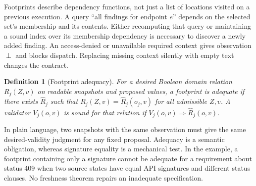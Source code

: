 \documentclass[pdflatex,sn-mathphys-num]{sn-jnl}
\theoremstyle{thmstyleone}
\theoremstyle{thmstylethree}
\newtheorem{definition}{Definition}
\theoremstyle{thmstyletwo}
\newcommand{\botv}{\perp}
\begin{document}
Footprints describe dependency functions, not just a list of locations visited on a previous execution. A query ``all findings for endpoint $e$'' depends on the selected set's membership and its contents. Either recomputing that query or maintaining a sound index over its membership dependency is necessary to discover a newly added finding. An access-denied or unavailable required context gives observation $\botv$ and blocks dispatch. Replacing missing context silently with empty text changes the contract.

\begin{definition}[Footprint adequacy]\label{def:adequate}
For a desired Boolean domain relation $R_j(Z,v)$ on readable snapshots and proposed values, a footprint is adequate if there exists $\widehat R_j$ such that $R_j(Z,v)=\widehat R_j(o_j,v)$ for all admissible $Z,v$. A validator $V_j(o,v)$ is sound for that relation if $V_j(o,v)\Rightarrow\widehat R_j(o,v)$.
\end{definition}

In plain language, two snapshots with the same observation must give the same desired-validity judgment for any fixed proposal. Adequacy is a semantic obligation, whereas signature equality is a mechanical test. In the example, a footprint containing only a signature cannot be adequate for a requirement about status 409 when two source states have equal API signatures and different status clauses. No freshness theorem repairs an inadequate specification.
\end{document}
